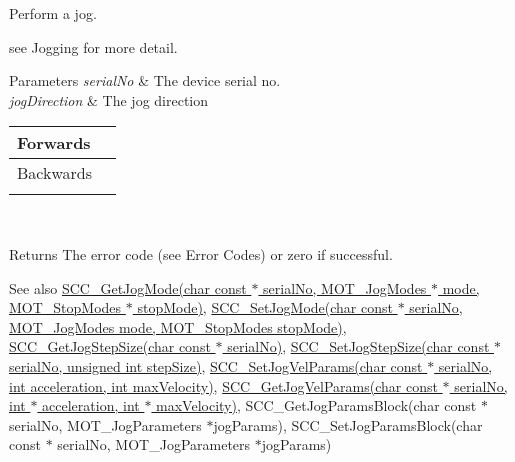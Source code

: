 Perform a jog. 

see Jogging for more detail.


\begin{DoxyParams}{Parameters}
{\em serial\+No} & The device serial no. \\
\hline
{\em jog\+Direction} & The jog direction \begin{tabularx}{\linewidth}{|*{2}{>{\raggedright\arraybackslash}X|}}\hline
Forwards&1 \\\cline{1-2}
Backwards&2 \\\cline{1-2}
\end{tabularx}
\\
\hline
\end{DoxyParams}
\begin{DoxyReturn}{Returns}
The error code (see Error Codes) or zero if successful. 
\end{DoxyReturn}
\begin{DoxySeeAlso}{See also}
\hyperlink{group___k_cube_stepper_ga175e078da8fb47396ce927ed6bf8fbd9}{S\+C\+C\+\_\+\+Get\+Jog\+Mode(char const $\ast$ serial\+No, M\+O\+T\+\_\+\+Jog\+Modes $\ast$ mode, M\+O\+T\+\_\+\+Stop\+Modes $\ast$ stop\+Mode)}, \hyperlink{group___k_cube_stepper_ga6504337d0dfd4ae9076f493b0f209ee5}{S\+C\+C\+\_\+\+Set\+Jog\+Mode(char const $\ast$ serial\+No, M\+O\+T\+\_\+\+Jog\+Modes mode, M\+O\+T\+\_\+\+Stop\+Modes stop\+Mode)}, \hyperlink{group___k_cube_stepper_gaa628ab92b321b2fc84b83e234c10eda9}{S\+C\+C\+\_\+\+Get\+Jog\+Step\+Size(char const $\ast$ serial\+No)}, \hyperlink{group___k_cube_stepper_gafb9a2b1e88b11dc485de37787ed9866c}{S\+C\+C\+\_\+\+Set\+Jog\+Step\+Size(char const $\ast$ serial\+No, unsigned int step\+Size)}, \hyperlink{group___k_cube_stepper_ga060d0d1d5f56464d3ee486117034aaf4}{S\+C\+C\+\_\+\+Set\+Jog\+Vel\+Params(char const $\ast$ serial\+No, int acceleration, int max\+Velocity)}, \hyperlink{group___k_cube_stepper_gad17e113a6d0742937c7ef2955cf1aecc}{S\+C\+C\+\_\+\+Get\+Jog\+Vel\+Params(char const $\ast$ serial\+No, int $\ast$ acceleration, int $\ast$ max\+Velocity)}, S\+C\+C\+\_\+\+Get\+Jog\+Params\+Block(char const $\ast$ serial\+No, M\+O\+T\+\_\+\+Jog\+Parameters $\ast$jog\+Params), S\+C\+C\+\_\+\+Set\+Jog\+Params\+Block(char const $\ast$ serial\+No, M\+O\+T\+\_\+\+Jog\+Parameters $\ast$jog\+Params)


\end{DoxySeeAlso}

\begin{DoxyCodeInclude}
\end{DoxyCodeInclude}
